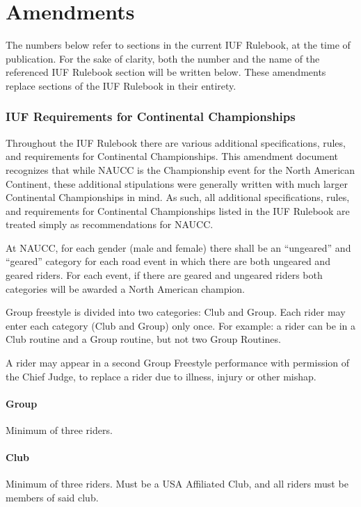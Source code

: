 \part{Amendments}
\parttoc
{}

The numbers below refer to sections in the current IUF Rulebook, at the time of publication. For the sake of clarity, both the number and the name of the referenced IUF Rulebook section will be written below. These amendments replace sections of the IUF Rulebook in their entirety.

\section{IUF Requirements for Continental Championships}
Throughout the IUF Rulebook there are various additional specifications, rules, and requirements for Continental Championships.
This amendment document recognizes that while NAUCC is the Championship event for the North American Continent, these additional stipulations were generally written with much larger Continental Championships in mind.
As such, all additional specifications, rules, and requirements for Continental Championships listed in the IUF Rulebook are treated simply as recommendations for NAUCC.

At NAUCC, for each gender (male and female) there shall be an ``ungeared'' and ``geared'' category for each road event in which there are both ungeared and geared riders.
For each event, if there are geared and ungeared riders both categories will be awarded a North American champion.

Group freestyle is divided into two categories: Club and Group.
Each rider may enter each category (Club and Group) only once.
For example: a rider can be in a Club routine and a Group routine, but not two Group Routines.

A rider may appear in a second Group Freestyle performance with permission of the Chief Judge, to replace a rider due to illness, injury or other mishap.

\subsection{Group}
Minimum of three riders.

\subsection{Club}
Minimum of three riders. Must be a USA Affiliated Club, and all riders must be members of said club.

